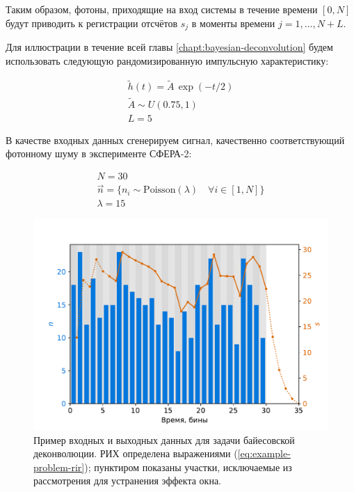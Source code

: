 \documentclass[12pt]{book}
\begin{document}
	Таким образом, фотоны, приходящие на вход системы в течение времени $\left[0, N\right]$ будут приводить к регистрации отсчётов $s_j$ в моменты времени $j = 1, \ldots, N + L$.
	
	Для иллюстрации в течение всей главы \ref{chapt:bayesian-deconvolution} будем использовать следующую рандомизированную импульсную характеристику: 
	
	\begin{equation}
		\label{eq:example-problem-rir}
		\begin{gathered}
			\tilde{h}(t) = \tilde{A} \, \exp(-t/2) \\
			\tilde{A} \sim U(0.75, 1) \\
			L = 5
		\end{gathered}
	\end{equation}
	
	В качестве входных данных сгенерируем сигнал, качественно соответствующий фотонному шуму в эксперименте СФЕРА-2: 
	
	\begin{equation}
		\label{eq:example-problem-input}
		\begin{gathered}
			N = 30 \\
			\vec{n} = \{n_i \sim \mathrm{Poisson}(\lambda) \quad \forall i \in [1, N]\} \\
			\lambda = 15
		\end{gathered}
	\end{equation} 
	
	\begin{figure}
		\centering
		\includegraphics[width=\columnwidth]{problem-setup-example}
		\caption{Пример входных и выходных данных для задачи байесовской деконволюции. РИХ определена выражениями (\ref{eq:example-problem-rir}); пунктиром показаны участки, исключаемые из рассмотрения для устранения эффекта окна.}
		\label{pic:problem-setup}
	\end{figure}
	
\end{document}
